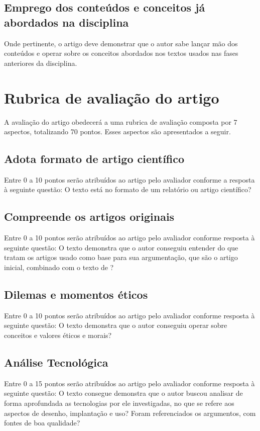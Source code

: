 \documentclass[12pt]{article}
\begin{document}
	\subsection{\label{conteudos}Emprego dos conteúdos e conceitos já abordados na disciplina}

	Onde pertinente, o artigo deve demonstrar que o autor sabe lançar mão dos conteúdos e operar sobre os conceitos abordados nos textos usados nas fases anteriores da disciplina.

	\section{\label{rubrica}Rubrica de avaliação do artigo}
	A avaliação do artigo obedecerá a uma rubrica de avaliação composta por 7 aspectos, totalizando 70 pontos. Esses aspectos são apresentados a seguir.

	\subsection{Adota formato de artigo científico}
	Entre 0 a 10 pontos serão atribuídos ao artigo pelo avaliador conforme a resposta à seguinte questão: O texto está no formato de um relatório ou artigo científico?

	\subsection{Compreende os artigos originais}

	Entre 0 a 10 pontos serão atribuídos ao artigo pelo avaliador conforme resposta à seguinte questão: O texto demonstra que o autor conseguiu entender do que tratam os artigos usado como base para sua argumentação, que são o artigo inicial, combinado com o texto de \citet{jones_teaching_2016}?

	\subsection{Dilemas e momentos éticos}
	Entre 0 a 10 pontos serão atribuídos ao artigo pelo avaliador conforme resposta à seguinte questão: O texto demonstra que o autor conseguiu operar sobre conceitos e valores éticos e morais?

	\subsection{Análise Tecnológica}
	Entre 0 a 15 pontos serão atribuídos ao artigo pelo avaliador conforme resposta à seguinte questão: O texto consegue demonstra que o autor buscou analisar de forma aprofundada as tecnologias por ele investigadas, no que se refere aos aspectos de desenho, implantação e uso? Foram referenciados os argumentos, com fontes de boa qualidade?
\end{document}
